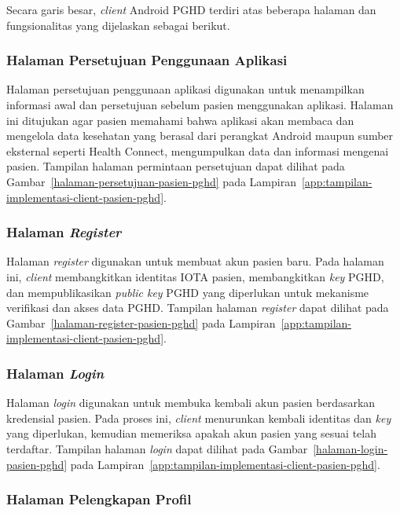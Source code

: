 Secara garis besar, \textit{client} Android PGHD terdiri atas beberapa halaman dan fungsionalitas yang dijelaskan sebagai berikut.

\subsubsection{Halaman Persetujuan Penggunaan Aplikasi}

Halaman persetujuan penggunaan aplikasi digunakan untuk menampilkan informasi awal dan persetujuan sebelum pasien menggunakan aplikasi. 
Halaman ini ditujukan agar pasien memahami bahwa aplikasi akan membaca dan mengelola data kesehatan yang berasal dari perangkat Android maupun sumber eksternal seperti Health Connect, mengumpulkan data dan informasi mengenai pasien.
Tampilan halaman permintaan persetujuan dapat dilihat pada Gambar~\ref{halaman-persetujuan-pasien-pghd} pada Lampiran~\ref{app:tampilan-implementasi-client-pasien-pghd}.

\subsubsection{Halaman \textit{Register}}

Halaman \textit{register} digunakan untuk membuat akun pasien baru. 
Pada halaman ini, \textit{client} membangkitkan identitas IOTA pasien, membangkitkan \textit{key} PGHD, dan mempublikasikan \textit{public key} PGHD yang diperlukan untuk mekanisme verifikasi dan akses data PGHD\@.
Tampilan halaman \textit{register} dapat dilihat pada Gambar~\ref{halaman-register-pasien-pghd} pada Lampiran~\ref{app:tampilan-implementasi-client-pasien-pghd}.

\subsubsection{Halaman \textit{Login}}

Halaman \textit{login} digunakan untuk membuka kembali akun pasien berdasarkan kredensial pasien. 
Pada proses ini, \textit{client} menurunkan kembali identitas dan \textit{key} yang diperlukan, kemudian memeriksa apakah akun pasien yang sesuai telah terdaftar.
Tampilan halaman \textit{login} dapat dilihat pada Gambar~\ref{halaman-login-pasien-pghd} pada Lampiran~\ref{app:tampilan-implementasi-client-pasien-pghd}.

\subsubsection{Halaman Pelengkapan Profil}

